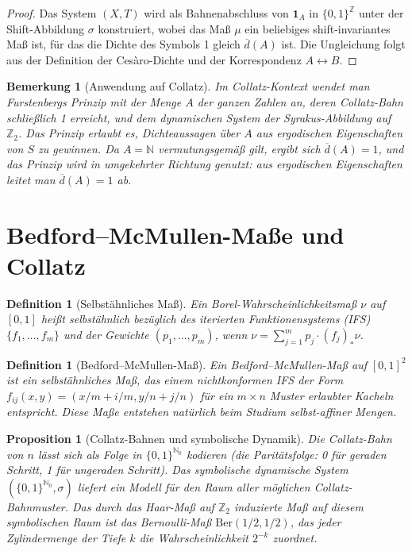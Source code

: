 \documentclass[12pt,a4paper]{article}
\newtheorem{proposition}[theorem]{Proposition}
\newtheorem{definition}[theorem]{Definition}
\newtheorem{remark}[theorem]{Bemerkung}
\begin{document}
\begin{proof}
Das System $(X, T)$ wird als Bahnenabschluss von $\mathbf{1}_A$ in $\{0,1\}^\mathbb{Z}$
unter der Shift-Abbildung $\sigma$ konstruiert, wobei das Maß $\mu$ ein beliebiges
shift-invariantes Maß ist, für das die Dichte des Symbols 1 gleich $\overline{d}(A)$ ist.
Die Ungleichung folgt aus der Definition der Cesàro-Dichte und der Korrespondenz
$A \leftrightarrow B$.
\end{proof}

\begin{remark}[Anwendung auf Collatz]\label{rem:furstenberg_collatz}
Im Collatz-Kontext wendet man Furstenbergs Prinzip mit der Menge $A$ der ganzen Zahlen
an, deren Collatz-Bahn schließlich 1 erreicht, und dem dynamischen System der
Syrakus-Abbildung auf $\mathbb{Z}_2$. Das Prinzip erlaubt es, Dichteaussagen über $A$
aus ergodischen Eigenschaften von $S$ zu gewinnen. Da $A = \mathbb{N}$ vermutungsgemäß
gilt, ergibt sich $\overline{d}(A) = 1$, und das Prinzip wird in umgekehrter Richtung
genutzt: aus ergodischen Eigenschaften leitet man $\overline{d}(A) = 1$ ab.
\end{remark}

\section{Bedford--McMullen-Maße und Collatz}

\begin{definition}[Selbstähnliches Maß]\label{def:selbstaehnlich}
Ein Borel-Wahrscheinlichkeitsmaß $\nu$ auf $[0,1]$ heißt \emph{selbstähnlich}
bezüglich des iterierten Funktionensystems (IFS) $\{f_1, \ldots, f_m\}$ und der
Gewichte $(p_1, \ldots, p_m)$, wenn
$\nu = \sum_{j=1}^m p_j \cdot (f_j)_* \nu$.
\end{definition}

\begin{definition}[Bedford--McMullen-Maß]\label{def:bedford_mcmullen}
Ein \emph{Bedford--McMullen-Maß} auf $[0,1]^2$ ist ein selbstähnliches Maß, das einem
nichtkonformen IFS der Form $f_{ij}(x,y) = (x/m + i/m, y/n + j/n)$ für ein $m \times n$
Muster erlaubter Kacheln entspricht. Diese Maße entstehen natürlich beim Studium
selbst-affiner Mengen.
\end{definition}

\begin{proposition}[Collatz-Bahnen und symbolische Dynamik]\label{prop:symbolisch}
Die Collatz-Bahn von $n$ lässt sich als Folge in $\{0,1\}^{\mathbb{N}_0}$ kodieren
(die Paritätsfolge: 0 für geraden Schritt, 1 für ungeraden Schritt). Das symbolische
dynamische System $(\{0,1\}^{\mathbb{N}_0}, \sigma)$ liefert ein Modell für den Raum
aller möglichen Collatz-Bahnmuster.
Das durch das Haar-Maß auf $\mathbb{Z}_2$ induzierte Maß auf diesem symbolischen Raum
ist das Bernoulli-Maß $\mathrm{Ber}(1/2, 1/2)$, das jeder Zylindermenge der Tiefe $k$
die Wahrscheinlichkeit $2^{-k}$ zuordnet.
\end{proposition}
\end{document}
